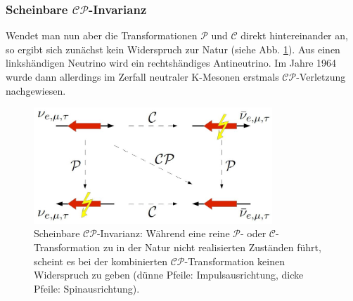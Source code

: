 \subsubsection{Scheinbare $\mathcal{CP}$-Invarianz}
Wendet man nun aber die Transformationen $\mathcal{P}$ und $\mathcal{C}$ direkt hintereinander an, so ergibt sich zunächst kein Widerspruch zur Natur (siehe Abb. \ref{fig:cp_invarianz}). Aus einen linkshändigen Neutrino wird ein rechtshändiges Antineutrino. Im Jahre 1964 wurde dann allerdings im Zerfall neutraler K-Mesonen erstmals $\mathcal{CP}$-Verletzung nachgewiesen. \cite{kleinknecht}

\begin{figure}[hptb]
\centering
\includegraphics[width = 0.8\textwidth]{cp_invarianz}
\caption{Scheinbare $\mathcal{CP}$-Invarianz: Während eine reine $\mathcal{P}$- oder $\mathcal{C}$-Transformation zu in der Natur nicht realisierten Zuständen führt, scheint es bei der kombinierten $\mathcal{CP}$-Transformation keinen Widerspruch zu geben (dünne Pfeile: Impulsausrichtung, dicke Pfeile: Spinausrichtung).}
\label{fig:cp_invarianz}
\end{figure}


